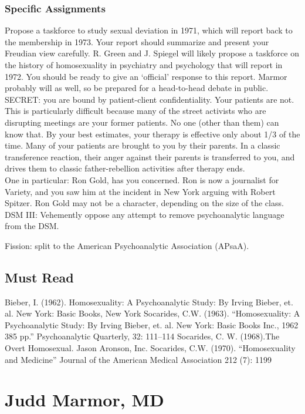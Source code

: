 \subsection{Specific Assignments}
\label{specificassignments}

Propose a taskforce to study sexual deviation in 1971, which will report back to the membership in 1973. Your report should summarize and present your Freudian view carefully.
R. Green and J. Spiegel will likely propose a taskforce on the history of homosexuality in psychiatry and psychology that will report in 1972. You should be ready to give an `official' response to this report. Marmor probably will as well, so be prepared for a head-to-head debate in public.
SECRET: you are bound by patient-client confidentiality. Your patients are not. This is particularly difficult because many of the street activists who are disrupting meetings are your former patients. No one (other than them) can know that. By your best estimates, your therapy is effective only about 1\slash 3 of the time. Many of your patients are brought to you by their parents. In a classic transference reaction, their anger against their parents is transferred to you, and drives them to classic father-rebellion activities after therapy ends.\\
One in particular: Ron Gold, has you concerned. Ron is now a journalist for Variety, and you saw him at the incident in New York arguing with Robert Spitzer. Ron Gold may not be a character, depending on the size of the class.
DSM III: Vehemently oppose any attempt to remove psychoanalytic language from the DSM.

Fission: split to the American Psychoanalytic Association (APsaA).

\section{Must Read}
\label{mustread}

Bieber, I. (1962). Homosexuality: A Psychoanalytic Study: By Irving Bieber, et. al. New York: Basic Books, New York
Socarides, C.W. (1963). “Homosexuality: A Psychoanalytic Study: By Irving Bieber, et. al. New York: Basic Books Inc., 1962 385 pp.” Psychoanalytic Quarterly, 32: 111--114
Socarides, C. W. (1968).The Overt Homosexual. Jason Aronson, Inc.
Socarides, C.W. (1970). “Homosexuality and Medicine” Journal of the American Medical Association 212 (7): 1199

\chapter{Judd Marmor, MD}
\label{juddmarmormd}


